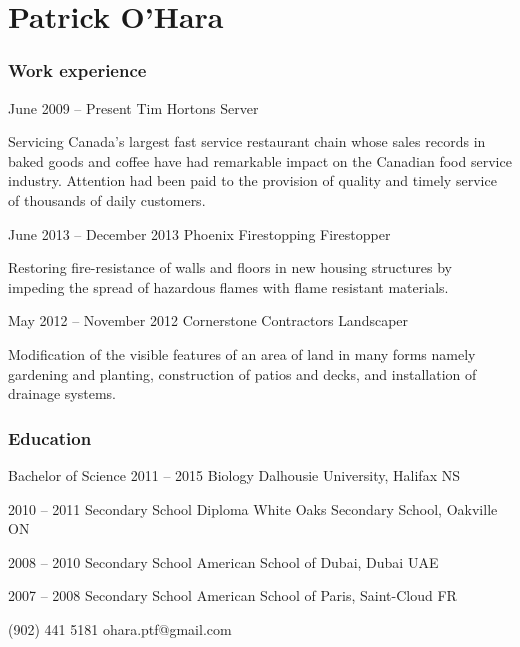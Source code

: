 \documentclass{tccv}
\begin{document}
\part{Patrick O'Hara}

\section{Work experience}

\begin{eventlist}

\item{June 2009 -- Present}
     {Tim Hortons}
     {Server}

Servicing Canada's largest fast service restaurant chain whose sales records in baked goods and coffee have had remarkable impact on the Canadian food service industry. Attention had been paid to the provision of quality and timely service of thousands of daily customers.  

\item{June 2013 -- December 2013}
     {Phoenix Firestopping}
     {Firestopper}

Restoring fire-resistance of walls and floors in new housing structures by impeding the spread of hazardous flames with flame resistant materials.

\item{May 2012 -- November 2012}
     {Cornerstone Contractors}
     {Landscaper}

Modification of the visible features of an area of land in many forms namely gardening and planting, construction of patios and decks, and installation of drainage systems.

\end{eventlist}

\section{Education}

\begin{yearlist}

\item[Bachelor of Science]{2011 -- 2015}
     {Biology}
     {Dalhousie University, Halifax NS}

\item{2010 -- 2011}
     {Secondary School Diploma}
     {White Oaks Secondary School, Oakville ON}

\item{2008 -- 2010}
     {Secondary School}
     {American School of Dubai, Dubai UAE}

\item{2007 -- 2008}
     {Secondary School}
     {American School of Paris, Saint-Cloud FR}

\end{yearlist}
    {(902) 441 5181}
    {ohara.ptf@gmail.com}
\end{document}
